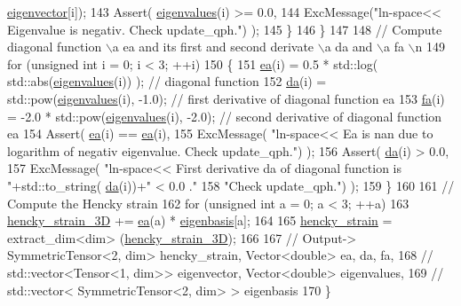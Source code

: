 \begin{DoxyCode}
      \hyperlink{classln__space_ada3f56f8a97f974275c267ac172a0b40}{eigenvector}[i]);
143             Assert( \hyperlink{classln__space_aad33c1f308694e2801bbea7730d3b9c6}{eigenvalues}(i) >= 0.0,
144                          ExcMessage(\textcolor{stringliteral}{"ln-space<< Eigenvalue is negativ. Check update\_qph."}) );
145          \}
146      \}
147 
148     \textcolor{comment}{// Compute diagonal function \(\backslash\)a ea and its first and second derivate \(\backslash\)a da and \(\backslash\)a fa \(\backslash\)n}
149      \textcolor{keywordflow}{for} (\textcolor{keywordtype}{unsigned} \textcolor{keywordtype}{int} i = 0; i < 3; ++i)
150      \{
151         \hyperlink{classln__space_add32551f879560be55f3d61a5a368ab4}{ea}(i) = 0.5 * std::log( std::abs(\hyperlink{classln__space_aad33c1f308694e2801bbea7730d3b9c6}{eigenvalues}(i)) );    \textcolor{comment}{// diagonal function}
152         \hyperlink{classln__space_a8d65915eb5122e3c5941b7163af57306}{da}(i) = std::pow(\hyperlink{classln__space_aad33c1f308694e2801bbea7730d3b9c6}{eigenvalues}(i), -1.0);                \textcolor{comment}{// first derivative of diagonal
       function ea}
153         \hyperlink{classln__space_aff1eab9675707d7aeed154aadb11adf4}{fa}(i) = -2.0 * std::pow(\hyperlink{classln__space_aad33c1f308694e2801bbea7730d3b9c6}{eigenvalues}(i), -2.0);         \textcolor{comment}{// second derivative of
       diagonal function ea}
154         Assert( \hyperlink{classln__space_add32551f879560be55f3d61a5a368ab4}{ea}(i) == \hyperlink{classln__space_add32551f879560be55f3d61a5a368ab4}{ea}(i),
155                      ExcMessage( \textcolor{stringliteral}{"ln-space<< Ea is nan due to logarithm of negativ eigenvalue. Check
       update\_qph."}) );
156         Assert( \hyperlink{classln__space_a8d65915eb5122e3c5941b7163af57306}{da}(i) > 0.0,
157                      ExcMessage( \textcolor{stringliteral}{"ln-space<< First derivative da of diagonal function is "}+std::to\_string(
      \hyperlink{classln__space_a8d65915eb5122e3c5941b7163af57306}{da}(i))+\textcolor{stringliteral}{" < 0.0 ."}
158                                  \textcolor{stringliteral}{"Check update\_qph."}) );
159      \}
160 
161     \textcolor{comment}{// Compute the Hencky strain}
162      \textcolor{keywordflow}{for} (\textcolor{keywordtype}{unsigned} \textcolor{keywordtype}{int} a = 0; a < 3; ++a)
163         \hyperlink{classln__space_a867cb10924f94e01595a67fdd456ecd4}{hencky\_strain\_3D} += \hyperlink{classln__space_add32551f879560be55f3d61a5a368ab4}{ea}(a) * \hyperlink{classln__space_a1e67221edabbd2db69aa4a21262bd1f4}{eigenbasis}[a];
164 
165      \hyperlink{classln__space_a2ccf220d438b7a29a53706167b102b5d}{hencky\_strain} = extract\_dim<dim> (\hyperlink{classln__space_a867cb10924f94e01595a67fdd456ecd4}{hencky\_strain\_3D});
166 
167     \textcolor{comment}{// Output-> SymmetricTensor<2, dim> hencky\_strain, Vector<double> ea, da, fa,}
168     \textcolor{comment}{//          std::vector<Tensor<1, dim>> eigenvector, Vector<double> eigenvalues,}
169     \textcolor{comment}{//          std::vector< SymmetricTensor<2, dim> > eigenbasis}
170 \}
\end{DoxyCode}


